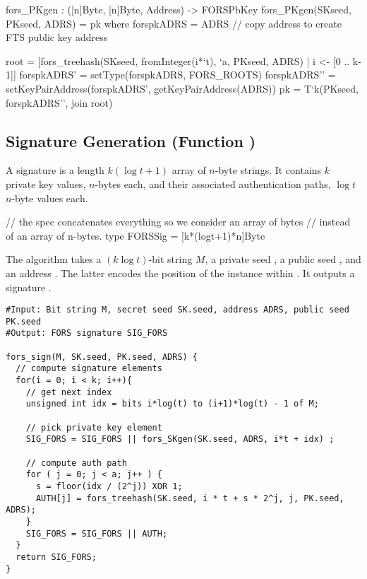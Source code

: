 \begin{code}
  fors_PKgen : ([n]Byte, [n]Byte, Address) -> FORSPbKey
  fors_PKgen(SKseed, PKseed, ADRS) = pk where
    forspkADRS = ADRS // copy address to create FTS public key address

    root = [fors_treehash(SKseed, fromInteger(i*`t), `a, PKseed, ADRS)
            | i <- [0 .. k-1]]
    forspkADRS' = setType(forspkADRS, FORS_ROOTS)
    forspkADRS'' = setKeyPairAddress(forspkADRS', getKeyPairAddress(ADRS))
    pk = T`{k}(PKseed, forspkADRS'', join root)
\end{code}

\subsection{\fors Signature Generation (Function \forssign)}
A \fors signature is a length $k(\log t + 1)$ array of $n$-byte strings. It contains 
$k$ private key values, $n$-bytes each, and their associated authentication
paths, $\log t$ $n$-byte values each.

\begin{code}
  // the spec concatenates everything so we consider an array of bytes
  // instead of an array of n-bytes.
  type FORSSig = [k*(logt+1)*n]Byte
\end{code}

The algorithm \forssign takes a $(k\log t)$-bit string $M$, a private seed \sseed, 
a public seed \pseed, and an address \adrs. The latter encodes the position of 
the \fors instance within \spx. It outputs a \fors signature \forssig.

\begin{lstlisting}[label=alg:fors_sign, language=pseudoc,
                   caption=\forssign\ -- Generating a FORS signature on string $M$.]
#Input: Bit string M, secret seed SK.seed, address ADRS, public seed PK.seed
#Output: FORS signature SIG_FORS

fors_sign(M, SK.seed, PK.seed, ADRS) {  
  // compute signature elements 
  for(i = 0; i < k; i++){
    // get next index
    unsigned int idx = bits i*log(t) to (i+1)*log(t) - 1 of M;
    
    // pick private key element
    SIG_FORS = SIG_FORS || fors_SKgen(SK.seed, ADRS, i*t + idx) ;
    
    // compute auth path
    for ( j = 0; j < a; j++ ) {
      s = floor(idx / (2^j)) XOR 1;
      AUTH[j] = fors_treehash(SK.seed, i * t + s * 2^j, j, PK.seed, ADRS);
    } 
    SIG_FORS = SIG_FORS || AUTH;
  }
  return SIG_FORS;
}
\end{lstlisting}

